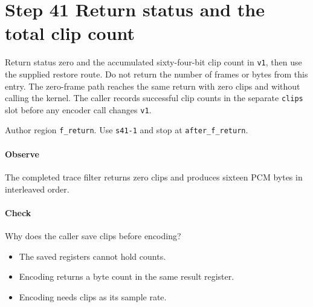\section{Step 41 Return status and the total clip count}\label{pcm-wav-s41}
Return status zero and the accumulated sixty-four-bit clip count in \texttt{v1}, then use the supplied restore route. Do not return the number of frames or bytes from this entry. The zero-frame path reaches the same return with zero clips and without calling the kernel. The caller records successful clip counts in the separate \texttt{clips} slot before any encoder call changes \texttt{v1}.

Author region \texttt{f\_return}. Use \texttt{s41-1} and stop at \texttt{after\_f\_return}.

\paragraph{Observe} The completed trace filter returns zero clips and produces sixteen PCM bytes in interleaved order.

\paragraph{Check} Why does the caller save clips before encoding?
\begin{itemize}
  \item[A.] The saved registers cannot hold counts.
  \item[B.] Encoding returns a byte count in the same result register.
  \item[C.] Encoding needs clips as its sample rate.
\end{itemize}
